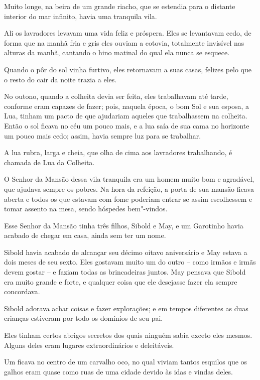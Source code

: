  


Muito longe, na beira de um grande riacho, que se estendia para o
distante interior do mar infinito, havia uma tranquila vila.

Ali os lavradores levavam uma vida feliz e próspera. Eles se levantavam
cedo, de forma que na manhã fria e gris eles ouviam a cotovia,
totalmente invisível nas alturas da manhã, cantando o hino matinal do
qual ela nunca se esquece.

Quando o pôr do sol vinha furtivo, eles retornavam a suas casas, felizes
pelo que o resto do cair da noite trazia a eles.

No outono, quando a colheita devia ser feita, eles trabalhavam até
tarde, conforme eram capazes de fazer; pois, naquela época, o bom Sol e
sua esposa, a Lua, tinham um pacto de que ajudariam aqueles que
trabalhassem na colheita. Então o sol ficava no céu um pouco mais, e a
lua saía de sua cama no horizonte um pouco mais cedo; assim, havia
sempre luz para se trabalhar.

A lua rubra, larga e cheia, que olha de cima aos lavradores trabalhando,
é chamada de Lua da Colheita.

O Senhor da Mansão dessa vila tranquila era um homem muito bom e
agradável, que ajudava sempre os pobres. Na hora da refeição, a porta de
sua mansão ficava aberta e todos os que estavam com fome poderiam entrar
se assim escolhessem e tomar assento na mesa, sendo hóspedes bem"-vindos.

Esse Senhor da Mansão tinha três filhos, Sibold e May, e um Garotinho
havia acabado de chegar em casa, ainda sem ter um nome.

Sibold havia acabado de alcançar seu décimo oitavo aniversário e May
estava a dois meses de seu sexto. Eles gostavam muito um do outro --
como irmãos e irmãs devem gostar -- e faziam todas as brincadeiras
juntos. May pensava que Sibold era muito grande e forte, e qualquer
coisa que ele desejasse fazer ela sempre concordava.

Sibold adorava achar coisas e fazer explorações; e em tempos diferentes
as duas crianças estiveram por todo os domínios de seu pai.

Eles tinham certos abrigos secretos dos quais ninguém sabia exceto eles
mesmos. Alguns deles eram lugares extraordinários e deleitáveis.

Um ficava no centro de um carvalho oco, no qual viviam tantos esquilos
que os galhos eram quase como ruas de uma cidade devido às idas e vindas
deles.

